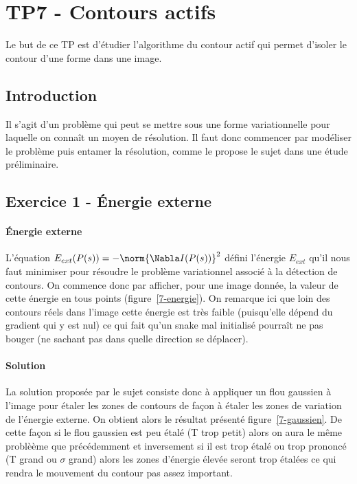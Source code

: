 \section{TP7 - Contours actifs}
Le but de ce TP est d'étudier l'algorithme du contour actif qui permet d'isoler le contour d'une forme dans une image.

\subsection{Introduction}
Il s'agit d'un problème qui peut se mettre sous une forme variationnelle pour laquelle on connaît un moyen de résolution. Il faut donc commencer par modéliser le problème puis entamer la résolution, comme le propose le sujet dans une étude préliminaire.

\subsection{Exercice 1 - Énergie externe}
\paragraph{Énergie externe}
L'équation $E_{ext}(P(s)) = - \norm{\Nabla I(P(s))}^2$ défini l'énergie $E_{ext}$ qu'il nous faut minimiser pour résoudre le problème variationnel associé à la détection de contours. On commence donc par afficher, pour une image donnée, la valeur de cette énergie en tous points (figure~\ref{7-energie}). On remarque ici que loin des contours réels dans l'image cette énergie est très faible (puisqu'elle dépend du gradient qui y est nul) ce qui fait qu'un snake mal initialisé pourraît ne pas bouger (ne sachant pas dans quelle direction se déplacer).

\begin{figure}
\end{figure}

\paragraph{Solution}
La solution proposée par le sujet consiste donc à appliquer un flou gaussien à l'image pour étaler les zones de contours de façon à étaler les zones de variation de l'énergie externe. On obtient alors le résultat présenté figure~\ref{7-gaussien}. De cette façon si le flou gaussien est peu étalé (T trop petit) alors on aura le même problèème que précédemment et inversement si il est trop étalé ou trop prononcé (T grand ou $\sigma$ grand) alors les zones d'énergie élevée seront trop étalées ce qui rendra le mouvement du contour pas assez important.

